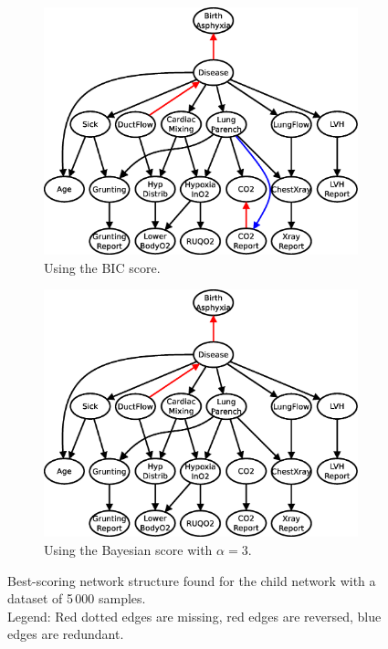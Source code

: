 \documentclass[english,cover]{fitthesis} %
\begin{document}
\begin{figure}[ht]
    \centering
    \begin{subfigure}[b]{0.45\linewidth}
        \hspace{-2.3cm}
        \includegraphics[scale=0.37]{fig/structure-learning-child-5000-bic}
        \caption{Using the BIC score.}
        \label{fig:structure-learning-child-5000-bic}
    \end{subfigure}
    \begin{subfigure}[b]{0.45\linewidth}
        \hspace{-0.1cm}
        \includegraphics[scale=0.37]{fig/structure-learning-child-5000-bayes-3_0}
        \caption{Using the Bayesian score with $\alpha = 3$.}
        \label{fig:structure-learning-child-5000-bayes-3_0}
    \end{subfigure}
    \caption{Best-scoring network structure found for the child network with a dataset of 5\,000 samples.
    \\Legend: Red dotted edges are missing, red edges are reversed, blue edges are redundant.}
\end{figure}
\end{document}
